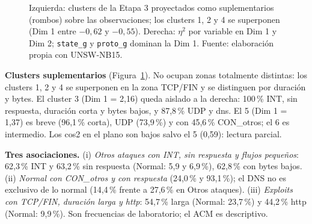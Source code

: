 \begin{figure}[htbp]
  \centering
  \caption[Clusters suplementarios y eta$^2$ del ACM]{Izquierda: clusters de la Etapa 3 proyectados como suplementarios (rombos) sobre las observaciones; los clusters 1, 2 y 4 se superponen (Dim 1 entre $-0{,}62$ y $-0{,}55$). Derecha: $\eta^2$ por variable en Dim 1 y Dim 2; \texttt{state\_g} y \texttt{proto\_g} dominan la Dim 1. Fuente: elaboración propia con UNSW-NB15.}
  \label{fig:acm-clusters}
\end{figure}

\textbf{Clusters suplementarios} (Figura~\ref{fig:acm-clusters}). No ocupan zonas totalmente distintas: los clusters 1, 2 y 4 se superponen en la zona TCP/FIN y se distinguen por duración y bytes. El cluster 3 (Dim 1 = 2,16) queda aislado a la derecha: 100\,\% INT, sin respuesta, duración corta y bytes bajos, y 87,8\,\% UDP y dns. El 5 (Dim 1 = 1,37) es breve (96,1\,\% corta), UDP (73,9\,\%) y con 45,6\,\% CON\_otros; el 6 es intermedio. Los cos2 en el plano son bajos salvo el 5 (0,59): lectura parcial.

\textbf{Tres asociaciones.} (i) \emph{Otros ataques con INT, sin respuesta y flujos pequeños}: 62,3\,\% INT y 63,2\,\% sin respuesta (Normal: 5,9 y 6,9\,\%), 62,8\,\% con bytes bajos. (ii) \emph{Normal con CON\_otros y con respuesta} (24,0\,\% y 93,1\,\%); el DNS no es exclusivo de lo normal (14,4\,\% frente a 27,6\,\% en Otros ataques). (iii) \emph{Exploits con TCP/FIN, duración larga y http}: 54,7\,\% larga (Normal: 23,7\,\%) y 44,2\,\% http (Normal: 9,9\,\%). Son frecuencias de laboratorio; el ACM es descriptivo.
